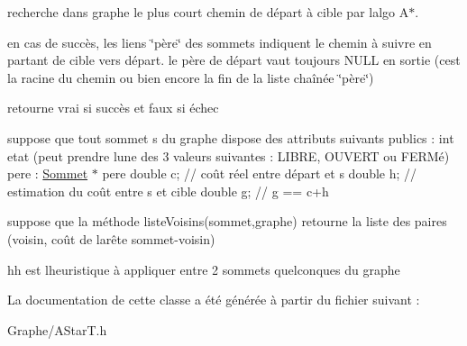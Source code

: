 recherche dans graphe le plus court chemin de départ à cible par l\textquotesingle{}algo A$\ast$. 

en cas de succès, les liens \char`\"{}père\char`\"{} des sommets indiquent le chemin à suivre en partant de cible vers départ. le père de départ vaut toujours N\+U\+LL en sortie (c\textquotesingle{}est la racine du chemin ou bien encore la fin de la liste chaînée \char`\"{}père\char`\"{})

retourne vrai si succès et faux si échec

suppose que tout sommet s du graphe dispose des attributs suivants publics \+: int etat (peut prendre l\textquotesingle{}une des 3 valeurs suivantes \+: L\+I\+B\+RE, O\+U\+V\+E\+RT ou F\+E\+R\+Mé) pere \+: \mbox{\hyperlink{class_sommet}{Sommet}} $\ast$ pere double c; // coût réel entre départ et s double h; // estimation du coût entre s et cible double g; // g == c+h

suppose que la méthode liste\+Voisins(sommet,graphe) retourne la liste des paires (voisin, coût de l\textquotesingle{}arête sommet-\/voisin)

hh est l\textquotesingle{}heuristique à appliquer entre 2 sommets quelconques du graphe 

La documentation de cette classe a été générée à partir du fichier suivant \+:\begin{DoxyCompactItemize}
\item 
Graphe/A\+Star\+T.\+h\end{DoxyCompactItemize}
